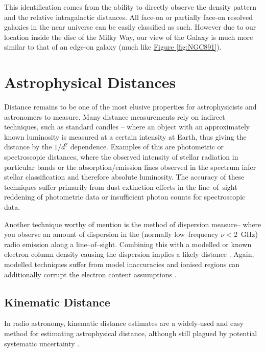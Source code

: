 		This identification comes from the ability to directly observe the density pattern and the relative intragalactic distances. All face-on or partially face-on resolved galaxies in the near universe can be easily classified as such. However due to our location inside the disc of the Milky Way, our view of the Galaxy is much more similar to that of an edge-on galaxy (much like \hyperref[fig:NGC891]{Figure \ref*{fig:NGC891}}).

	\section{Astrophysical Distances}
		Distance remains to be one of the most elusive properties for astrophysicists and astronomers to measure. Many distance measurements rely on indirect techniques, such as standard candles -- where an object with an approximately known luminosity is measured at a certain intensity at Earth, thus giving the distance by the $1/{d^2}$ dependence. Examples of this are photometric or spectroscopic distances, where the observed intensity of stellar radiation in particular bands or the absorption/emission lines observed in the spectrum infer stellar classification and therefore absolute luminosity. The accuracy of these techniques suffer primarily from dust extinction effects in the line--of--sight reddening of photometric data or insufficient photon counts for spectroscopic data.
		
		Another technique worthy of mention is the method of dispersion measure-- where you observe an amount of dispersion in the (normally low--frequency $\nu<2$~GHz) radio emission along a line--of--sight. Combining this with a modelled or known electron column density causing the dispersion implies a likely distance \citep[e.g. ][]{Cordes2004,Yao2019}. Again, modelled techniques suffer from model inaccuracies and ionised regions can additionally corrupt the electron content assumptions \citep[e.g. Sagittarius A*; ][]{Reid1988}.
	
		\subsection{Kinematic Distance}
			In radio astronomy, kinematic distance estimates are a widely-used and easy method for estimating astrophysical distance, although still plagued by potential systematic uncertainty \citep{Gomez2006}. 
			
